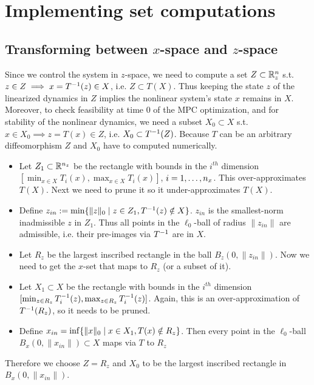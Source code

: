 \section{Implementing set computations}
\label{sec:implementing set computations}

\subsection{Transforming between $x$-space and $z$-space}
\label{sec:transforming x to z}
Since we control the system in $z$-space, we need to compute a set $Z \subset \mathbb{R}^n_z$ s.t. $z \in Z \implies x = T^{-1}(z) \in X$, i.e. $Z \subset T(X)$.
Thus keeping the state $z$ of the linearized dynamics in $Z$ implies the nonlinear system's state $x$ remains in $X$.
Moreover, to check feasibility at time 0 of the MPC optimization, and for stability of the nonlinear dynamics, we need a subset $X_0 \subset X$ s.t. $x \in X_0 \implies z = T(x) \in Z$, i.e. $X_0 \subset T^{-1}(Z)$.
Because $T$ can be an arbitrary diffeomorphism $Z$ and $X_0$ have to computed numerically.
\begin{itemize}
	\item Let $Z_1 \subset \mathbb{R}^{n_z}$ be the rectangle with bounds in the $i^{th}$ dimension $[ \min_{x \in X} T_i(x),  \max_{x \in X} T_i(x) ]$, $i=1,\ldots, n_x$.
	This over-approximates $T(X)$. 
	Next we need to prune it so it under-approximates $T(X)$. 
	\item Define $z_{in} := \min \{ \|z \|_0 \;|\; z \in Z_1, T^{-1}(z) \notin X\}$.
	$z_{in}$ is the smallest-norm inadmissible $z$ in $Z_1$.
	Thus all points in the $\ell_0$-ball of radius $\|z_{in}\|$ are admissible, i.e. their pre-images via $T^{-1}$ are in $X$.
	\item Let $R_z$ be the largest inscribed rectangle in the ball $B_z(0,\|z_{in}\|)$.
	Now we need to get the $x$-set that maps to $R_z$  (or a subset of it).
	\item Let $X_1 \subset X$ be the rectangle with bounds in the $i^{th}$ dimension $[\min_{z \in R_{z}} T^{-1}_i(z),  \max_{z \in R_{z}} T^{-1}_i(z) ]$.
	Again, this is an over-approximation of $T^{-1}(R_{z})$, so it needs to be pruned.
	\item Define $x_{in} = \inf \{\|x\|_0 \;|\; x \in X_1, T(x) \notin R_{z}\}$.
	Then every point in the $\ell_0$-ball $B_x(0, \|x_{in}\|) \subset X$ maps via $T$ to $R_{z}$
\end{itemize}
Therefore we choose $Z = R_z$ and $X_0$ to be the largest inscribed rectangle in $B_x(0,  \|x_{in}\|)$.
